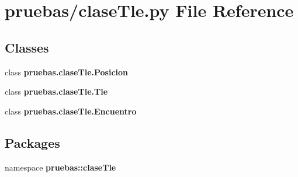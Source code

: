 \section{pruebas/clase\-Tle.py \-File \-Reference}
\label{clase_tle_8py}
\subsection*{\-Classes}
\begin{DoxyCompactItemize}
\item 
class {\bf pruebas.\-clase\-Tle.\-Posicion}
\item 
class {\bf pruebas.\-clase\-Tle.\-Tle}
\item 
class {\bf pruebas.\-clase\-Tle.\-Encuentro}
\end{DoxyCompactItemize}
\subsection*{\-Packages}
\begin{DoxyCompactItemize}
\item 
namespace {\bf pruebas\-::clase\-Tle}
\end{DoxyCompactItemize}
